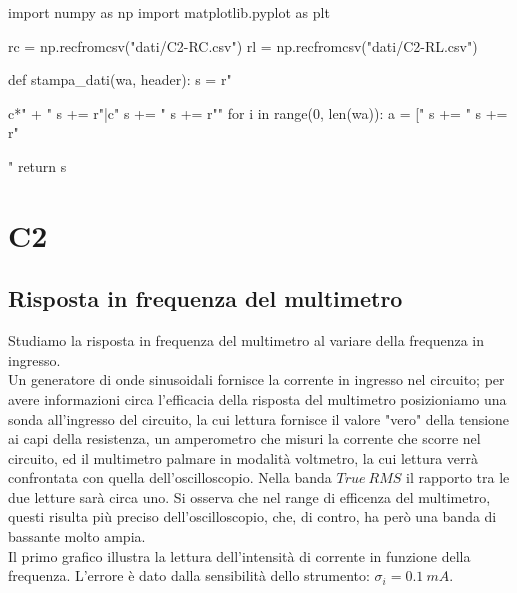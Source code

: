 \begin{sagesilent}
import numpy as np
import matplotlib.pyplot as plt

rc = np.recfromcsv("dati/C2-RC.csv")
rl = np.recfromcsv("dati/C2-RL.csv")



def stampa_dati(wa, header):
  s = r"\begin{tabular}{c*{" + "%
  s += r"}{|c}}"
  s += "%
  s += r"\midrule"
  for i in range(0, len(wa)):
    a = ["%
    s += "%
  s += r"\end{tabular}"
  return s
  
  

\end{sagesilent}



\chapter{C2}


\section{Risposta in frequenza del multimetro}

Studiamo la risposta in frequenza del multimetro al variare della frequenza in ingresso. \\
Un generatore di onde sinusoidali fornisce la corrente in ingresso nel circuito; per avere informazioni circa l'efficacia della risposta del multimetro posizioniamo una sonda all'ingresso del circuito, la cui lettura fornisce il valore "vero" della tensione ai capi della resistenza, un amperometro che misuri la corrente che scorre nel circuito, ed il multimetro palmare in modalità voltmetro, la cui lettura verrà confrontata con quella dell'oscilloscopio. Nella banda $True\ RMS$ il rapporto tra le due letture sarà circa uno.
Si osserva che nel range di efficenza del multimetro, questi risulta più preciso dell'oscilloscopio, che, di contro, ha però una banda di bassante molto ampia.\\


Il primo grafico illustra la lettura dell'intensità di corrente in funzione della frequenza. L'errore è dato dalla sensibilità dello strumento: $\sigma_i = 0.1\ mA$.\\


